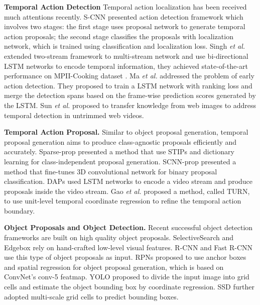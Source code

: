 \documentclass{bmvc2k}
\begin{document}
\textbf{Temporal Action Detection}
Temporal action localization has been received much attentions recently.  S-CNN \cite{Shou_2016_CVPR} presented action detection framework which involves two stages: the first stage uses proposal network to generate temporal action proposals; the second stage  classifies the proposals with localization network, which is trained using classification and localization loss. Singh \emph{et al.} \cite{Singh_2016_CVPR} extended two-stream \cite{simonyan2014two} framework to multi-stream network and use bi-directional LSTM networks to encode temporal information, they achieved state-of-the-art performance on MPII-Cooking dataset \cite{rohrbach2012database}. Ma \emph{et al.} \cite{Ma_2016_CVPR}  addressed the problem of early action detection. They proposed to train a LSTM network with ranking loss and merge the detection spans based on the frame-wise prediction scores generated by the LSTM. Sun \emph{et al.} \cite{sun2015temporal} proposed to transfer knowledge from web images to address temporal detection in untrimmed web videos. 

\textbf{Temporal Action Proposal.} Similar to object proposal generation, temporal proposal generation aims to produce class-agnostic proposals efficiently and accurately. Sparse-prop \cite{Heilbron_2016_CVPR} presented a method that use STIPs \cite{laptev2005space} and dictionary learning for class-independent proposal generation. SCNN-prop \cite{Shou_2016_CVPR} presented a method that fine-tunes 3D convolutional network \cite{tran2015learning} for binary proposal classification. DAPs \cite{escorcia2016daps} used LSTM networks to encode a video stream and produce proposals inside the video stream. Gao \emph{et al.} \cite{gao2017turn} proposed a method, called TURN,  to use unit-level temporal coordinate regression to refine the temporal action boundary.

\textbf{Object Proposals and Object Detection.} Recent successful object detection frameworks \cite{Girshick_2014_CVPR, girshick2015fast, ren2015faster} are built on high quality object proposals. SelectiveSearch \cite{uijlings2013selective} and Edgebox \cite{zitnick2014edge} rely on hand-crafted low-level visual features. R-CNN \cite{Girshick_2014_CVPR} and Fast R-CNN \cite{girshick2015fast} use this type of object proposals as input. RPNs \cite{ren2015faster} proposed to use anchor boxes and spatial regression for object proposal generation, which is based on ConvNet's conv-5 featmap. YOLO \cite{Redmon_2016_CVPR} proposed to divide the input image into grid cells and estimate the object bounding box by coordinate regression. SSD \cite{liu2015ssd} further adopted multi-scale grid cells to predict bounding boxes. 
\end{document}
